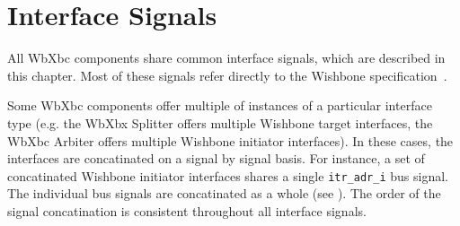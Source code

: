 
\section{Interface Signals}
\label{sig}

All WbXbc components share common interface signals, which are described in this
chapter. Most of these signals refer directly to the Wishbone specification~\cite{wishbone}.

Some WbXbc components offer multiple of instances of a particular interface type (e.g. the
WbXbx Splitter offers multiple Wishbone target interfaces, the WbXbc Arbiter offers multiple
Wishbone initiator interfaces). In these cases, the interfaces are concatinated on a signal
by signal basis.
For instance, a set of concatinated Wishbone initiator interfaces shares a single
\texttt{itr\_adr\_i} bus signal. The individual bus signals are concatinated as a whole
(see ).
The order of the signal concatination is consistent throughout all interface signals.

